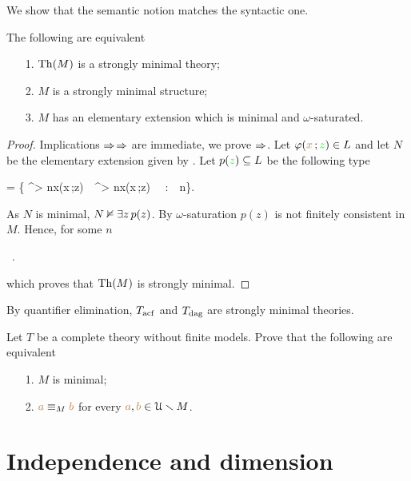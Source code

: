 We show that the semantic notion matches the syntactic one.

\begin{proposition}\label{prop_fmequivalenzadefinizioni}
The following are equivalent
\begin{itemize}
\item[1.] ${\rm Th}(M)$ is a strongly minimal theory;
\item[2.] $M$ is a strongly minimal structure; 
\item[3.] $M$ has an elementary extension which is minimal and $\omega$-saturated.
\end{itemize}
\end{proposition}
\begin{proof}
Implications $\Rightarrow$$\Rightarrow$ are immediate, we prove $\Rightarrow$.
Let $\varphi({\color{brown} x}\,;{\color{green} z})\in L$ and let $N$ be the elementary extension given by .
Let $p({\color{green} z})\subseteq L$ be the following type

{=}
{\Big\{ \E^{> n}{\mr x}\;\phi({\mr x}\,;{\gr z})\ \wedge\ \E^{> n}{\mr x}\;\neg\phi({\mr x}\,;{\gr z}) \ \ :\ \ n\in\omega\Big\}.}

As $N$ is minimal, $N\nvDash \exists z\,p(z)$.
By $\omega$-saturation $p(z)$ is not finitely consistent in $M$.
Hence, for some $n$ 

{\models}
{\ .}

which proves that ${\rm Th}(M)$ is strongly minimal.
\end{proof}

By quantifier elimination, $T_{\rm acf}$ and $T_{\rm dag}$ are strongly minimal theories.

\begin{exercise}
Let $T$ be a complete theory without finite models.
Prove that the following are equivalent
\begin{itemize}
\item[1.] $M$ is minimal;
\item[2.] ${\color{brown} a}\equiv_M{\color{brown} b}$ for every ${\color{brown} a}, {\color{brown} b}\in \EuScript U\smallsetminus M$.\QED
\end{itemize}
\end{exercise}



\section{Independence and dimension}
\def\medrel#1{\parbox[t]{5ex}{$\displaystyle\hfil #1$}}
\def\ceq#1#2#3{\parbox{35ex}{$\displaystyle #1$}\medrel{#2}$\displaystyle  #3$}


